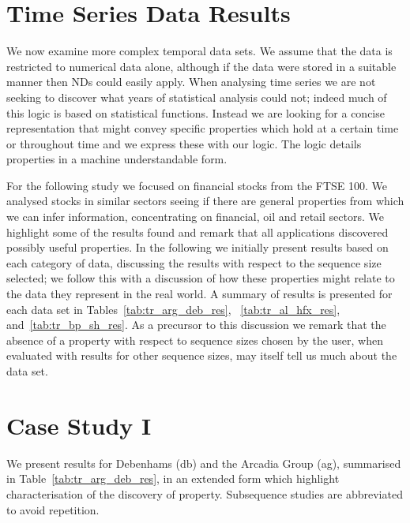 \section{Time Series Data Results}\label{sec:tr_tsares}


We now examine more complex temporal data sets. We 
assume that the data is restricted to numerical data alone, although
if the data were stored in a suitable manner then NDs
could easily apply. When analysing time series we are not seeking to
discover what years of statistical analysis could not; indeed much of
this logic is based on statistical functions. Instead we are looking
for a concise representation that might convey specific properties
which hold at a certain time or throughout time and we express these
with our logic. The logic details properties in a machine
understandable form. 


\medskip

For the following study we focused on financial stocks from the FTSE
100. We analysed stocks in similar sectors seeing if there are general
properties from which we can infer information, concentrating on
financial, oil and retail sectors. We highlight some of the results
found and remark that all applications discovered possibly useful
properties. In the following we initially present results based on each category
of data, discussing the results with respect to the sequence size
selected; we follow this with a discussion of how these properties
might relate to the data they represent in the real world. A summary
of results is presented for each data set in
Tables~\ref{tab:tr_arg_deb_res}, ~\ref{tab:tr_al_hfx_res},
and~\ref{tab:tr_bp_sh_res}. As a precursor to this discussion we
remark that the absence of a property with respect to sequence sizes
chosen by the user, when evaluated with results for other sequence
sizes, may itself tell us much about the data set.

\section{Case Study I}\label{sec:tr_case1}

We present results for Debenhams (db) and the Arcadia Group (ag),
summarised in Table~\ref{tab:tr_arg_deb_res}, in an extended form
which highlight characterisation of the discovery of
property. Subsequence studies are abbreviated to avoid repetition.


